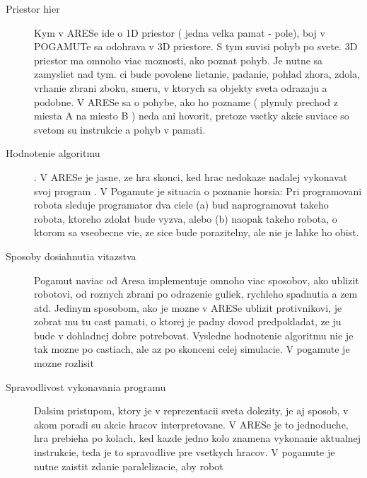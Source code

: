 \documentclass[a4paper,11pt,final]{report}
\begin{document}
\begin{description}
\item[Priestor hier] Kym v ARESe ide o 1D priestor ( jedna velka pamat - pole), boj v POGAMUTe sa odohrava v 3D priestore. S tym suvisi pohyb po svete. 3D priestor ma omnoho viac moznosti, ako poznat pohyb. Je nutne sa zamysliet nad tym. ci bude povolene lietanie, padanie, pohlad zhora, zdola, vrhanie zbrani zboku, smeru, v ktorych sa objekty sveta odrazaju a podobne. V ARESe sa o pohybe, ako ho pozname ( plynuly prechod z miesta A na miesto B ) neda ani hovorit, pretoze vsetky akcie suviace so svetom su instrukcie a pohyb v pamati. 
\item[Hodnotenie algoritmu]. V ARESe je jasne, ze hra skonci, ked hrac nedokaze nadalej vykonavat svoj program . V Pogamute je situacia o poznanie horsia: Pri programovani robota sleduje programator dva ciele (a) bud naprogramovat takeho robota, ktoreho zdolat bude vyzva, alebo (b) naopak takeho robota, o ktorom sa vseobecne vie, ze sice bude porazitelny, ale nie je lahke ho obist.
\item[Sposoby dosiahnutia vitazstva]
Pogamut naviac od Aresa implementuje omnoho viac sposobov, ako ublizit robotovi, od roznych zbrani po odrazenie guliek, rychleho spadnutia a zem atd. Jedinym sposobom, ako je mozne v ARESe ublizit protivnikovi, je zobrat mu tu cast pamati, o ktorej je padny dovod predpokladat, ze ju bude v dohladnej dobre potrebovat. Vysledne hodnotenie algoritmu nie je tak mozne po castiach, ale az po skonceni celej simulacie. V pogamute je mozne rozlisit  %
\item [Spravodlivost vykonavania programu] Dalsim pristupom, ktory je v reprezentacii sveta dolezity, je aj sposob, v akom poradi su akcie hracov interpretovane. V ARESe je to jednoduche, hra prebieha po kolach, ked kazde jedno kolo znamena vykonanie aktualnej instrukcie, teda je to spravodlive pre vsetkych hracov. V pogamute je nutne zaistit zdanie paralelizacie, aby robot 
\end{description}
\end{document}
